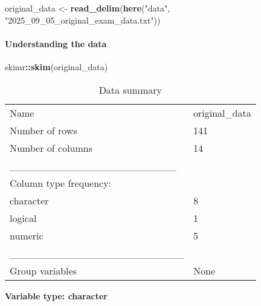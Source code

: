 \documentclass[
]{article}
\newenvironment{Shaded}{\begin{snugshade}}{\end{snugshade}}
\newcommand{\FunctionTok}[1]{\textcolor[rgb]{0.13,0.29,0.53}{\textbf{#1}}}
\newcommand{\NormalTok}[1]{#1}
\newcommand{\OtherTok}[1]{\textcolor[rgb]{0.56,0.35,0.01}{#1}}
\newcommand{\SpecialCharTok}[1]{\textcolor[rgb]{0.81,0.36,0.00}{\textbf{#1}}}
\newcommand{\StringTok}[1]{\textcolor[rgb]{0.31,0.60,0.02}{#1}}
\begin{document}
\begin{Shaded}
\begin{Highlighting}[]
\NormalTok{original\_data }\OtherTok{\textless{}{-}} \FunctionTok{read\_delim}\NormalTok{(}\FunctionTok{here}\NormalTok{(}\StringTok{"data"}\NormalTok{, }\StringTok{"2025\_09\_05\_original\_exam\_data.txt"}\NormalTok{))}
\end{Highlighting}
\end{Shaded}

\paragraph{Understanding the data}\label{understanding-the-data}

\begin{Shaded}
\begin{Highlighting}[]
\NormalTok{skimr}\SpecialCharTok{::}\FunctionTok{skim}\NormalTok{(original\_data)}
\end{Highlighting}
\end{Shaded}

\begin{longtable}[]{@{}ll@{}}
\caption{Data summary}\tabularnewline
\toprule\noalign{}
\endfirsthead
\endhead
\bottomrule\noalign{}
\endlastfoot
Name & original\_data \\
Number of rows & 141 \\
Number of columns & 14 \\
\_\_\_\_\_\_\_\_\_\_\_\_\_\_\_\_\_\_\_\_\_\_\_ & \\
Column type frequency: & \\
character & 8 \\
logical & 1 \\
numeric & 5 \\
\_\_\_\_\_\_\_\_\_\_\_\_\_\_\_\_\_\_\_\_\_\_\_\_ & \\
Group variables & None \\
\end{longtable}

\textbf{Variable type: character}
\end{document}
